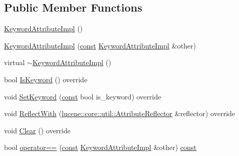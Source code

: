 \subsection*{Public Member Functions}
\begin{DoxyCompactItemize}
\item 
\mbox{\hyperlink{classlucene_1_1core_1_1analysis_1_1tokenattributes_1_1KeywordAttributeImpl_a1a92ef5f629fcca79c12a5009deb7941}{Keyword\+Attribute\+Impl}} ()
\item 
\mbox{\hyperlink{classlucene_1_1core_1_1analysis_1_1tokenattributes_1_1KeywordAttributeImpl_a8737063d5e2cb8ad21fdba8ec4ba210f}{Keyword\+Attribute\+Impl}} (\mbox{\hyperlink{ZlibCrc32_8h_a2c212835823e3c54a8ab6d95c652660e}{const}} \mbox{\hyperlink{classlucene_1_1core_1_1analysis_1_1tokenattributes_1_1KeywordAttributeImpl}{Keyword\+Attribute\+Impl}} \&other)
\item 
virtual \mbox{\hyperlink{classlucene_1_1core_1_1analysis_1_1tokenattributes_1_1KeywordAttributeImpl_aab9c236453177ca4e9c3cb86d3e93fa6}{$\sim$\+Keyword\+Attribute\+Impl}} ()
\item 
bool \mbox{\hyperlink{classlucene_1_1core_1_1analysis_1_1tokenattributes_1_1KeywordAttributeImpl_aa98aa28fbea635057a71d0129cb92a2e}{Is\+Keyword}} () override
\item 
void \mbox{\hyperlink{classlucene_1_1core_1_1analysis_1_1tokenattributes_1_1KeywordAttributeImpl_a1cae85f0e103d3dfa054c1a42e119de2}{Set\+Keyword}} (\mbox{\hyperlink{ZlibCrc32_8h_a2c212835823e3c54a8ab6d95c652660e}{const}} bool is\+\_\+keyword) override
\item 
void \mbox{\hyperlink{classlucene_1_1core_1_1analysis_1_1tokenattributes_1_1KeywordAttributeImpl_a610aab1880b02caf13fb7f1723c24c94}{Reflect\+With}} (\mbox{\hyperlink{namespacelucene_1_1core_1_1util_a7dbb701adaed055f73fb95eec83da10a}{lucene\+::core\+::util\+::\+Attribute\+Reflector}} \&reflector) override
\item 
void \mbox{\hyperlink{classlucene_1_1core_1_1analysis_1_1tokenattributes_1_1KeywordAttributeImpl_a019bfed2dce94170444db84c7575f43c}{Clear}} () override
\item 
bool \mbox{\hyperlink{classlucene_1_1core_1_1analysis_1_1tokenattributes_1_1KeywordAttributeImpl_a057cd81b19aa11973911473903ff84e3}{operator==}} (\mbox{\hyperlink{ZlibCrc32_8h_a2c212835823e3c54a8ab6d95c652660e}{const}} \mbox{\hyperlink{classlucene_1_1core_1_1analysis_1_1tokenattributes_1_1KeywordAttributeImpl}{Keyword\+Attribute\+Impl}} \&other) \mbox{\hyperlink{ZlibCrc32_8h_a2c212835823e3c54a8ab6d95c652660e}{const}}

\end{DoxyCompactItemize}
